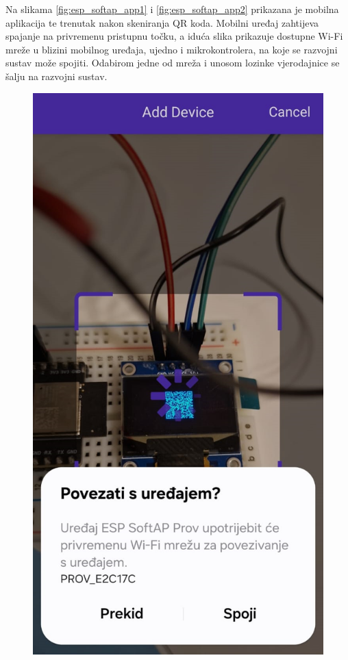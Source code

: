 Na slikama \ref{fig:esp_softap_app1} i \ref{fig:esp_softap_app2} prikazana je mobilna aplikacija te trenutak nakon skeniranja QR koda. Mobilni uređaj zahtijeva spajanje na privremenu pristupnu točku, a iduća slika prikazuje dostupne Wi-Fi mreže u blizini mobilnog uređaja, ujedno i mikrokontrolera, na koje se razvojni sustav može spojiti. Odabirom jedne od mreža i unosom lozinke vjerodajnice se šalju na razvojni sustav.

\begin{figure}[ht]
	\begin{minipage}[t]{0.3\textwidth}
		\includegraphics[width=\linewidth]{imgs/esp_softap_app1}

\end{minipage}
\end{figure}
